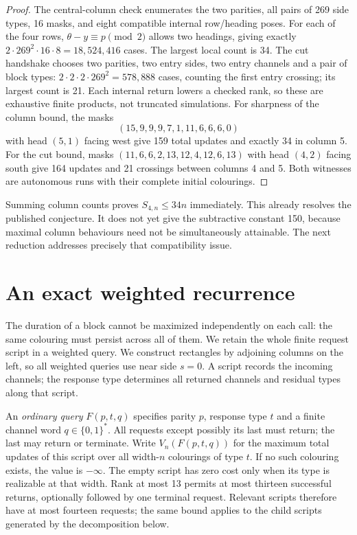 \documentclass[11pt]{article}
\theoremstyle{definition}\newtheorem{definition}[theorem]{Definition}
\newcommand{\minusinf}{-\infty}
\begin{document}
\begin{proof}
The central-column check enumerates the two parities, all pairs of 269 side
types, 16 masks, and eight compatible internal row/heading poses. For
each of the four rows, $\theta-y\equiv p\pmod2$ allows two headings, giving exactly
$2\cdot269^2\cdot16\cdot8=18,524,416$ cases. The largest local count is 34.
The cut handshake chooses two parities, two entry sides, two entry
channels and a pair of block types: $2\cdot2\cdot2\cdot269^2=578,888$
cases, counting the first entry crossing; its largest count is 21. Each internal return lowers a checked rank,
so these are exhaustive finite products, not truncated simulations.
For sharpness of the column bound, the masks
\[
 (15,9,9,9,7,1,11,6,6,6,0)
\]
with head $(5,1)$ facing west give 159 total updates and exactly 34 in column 5.
For the cut bound, masks $(11,6,6,2,13,12,4,12,6,13)$ with head $(4,2)$
facing south give 164 updates and 21 crossings between columns 4 and 5.
Both witnesses are autonomous runs with their complete initial colourings.
\end{proof}

Summing column counts proves $S_{4,n}\le34n$ immediately. This already resolves
the published conjecture. It does not yet give the subtractive constant 150,
because maximal column behaviours need not be simultaneously attainable.
The next reduction addresses precisely that compatibility issue.

\section{An exact weighted recurrence}\label{sec:weighted}
The duration of a block cannot be maximized independently on each call: the
same colouring must persist across all of them. We retain the whole finite
request script in a weighted query. We construct rectangles by adjoining
columns on the left, so all weighted queries use near side $s=0$.
A script records the incoming channels; the response type determines all
returned channels and residual types along that script.

An \emph{ordinary query} $F(p,t,q)$ specifies parity $p$, response type $t$ and
a finite channel word $q\in\{0,1\}^*$. All requests except possibly its last must return;
the last may return or terminate. Write $V_n(F(p,t,q))$ for the maximum
total updates of this script over all width-$n$ colourings of type $t$. If no such colouring exists,
the value is $\minusinf$. The empty script has zero cost only when its type is
realizable at that width. Rank at most 13 permits at most thirteen successful
returns, optionally followed by one terminal request. Relevant scripts
therefore have at most fourteen requests; the same bound applies to the
child scripts generated by the decomposition below.
\end{document}
